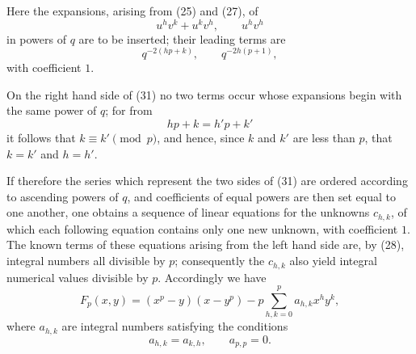 \documentclass[11pt]{article}
\begin{document}
Here the expansions, arising from (25) and (27), of
\[
u^hv^k+u^kv^h,
\qquad
u^hv^h
\]
in powers of $q$ are to be inserted; their leading terms are
\[
q^{-2(hp+k)},
\qquad
q^{-2h(p+1)},
\]
with coefficient $1$.

On the right hand side of (31) no two terms occur whose expansions begin with the same power of $q$; for from
\[
hp+k=h'p+k'
\]
it follows that $k\equiv k'\pmod p$, and hence, since $k$ and $k'$ are less than $p$, that $k=k'$ and $h=h'$.

If therefore the series which represent the two sides of (31) are ordered according to ascending powers of $q$, and coefficients of equal powers are then set equal to one another, one obtains a sequence of linear equations for the unknowns $c_{h,k}$, of which each following equation contains only one new unknown, with coefficient $1$. The known terms of these equations arising from the left hand side are, by (28), integral numbers all divisible by $p$; consequently the $c_{h,k}$ also yield integral numerical values divisible by $p$. Accordingly we have
\begin{equation}
F_p(x,y)=(x^p-y)(x-y^p)-p\sum_{h,k=0}^{p}a_{h,k}x^hy^k,
\tag{32}
\end{equation}
where $a_{h,k}$ are integral numbers satisfying the conditions
\[
a_{h,k}=a_{k,h},
\qquad
 a_{p,p}=0.
\]
\end{document}

